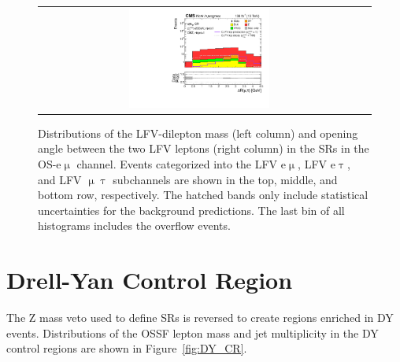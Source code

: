 \begin{figure}[tbh!]
\begin{center}
\begin{tabular}{cc}
 \includegraphics[width=0.45\textwidth]{figures/Part4/Evt/LFVmutaDr}\\
 \end{tabular}
 \caption{Distributions of the LFV-dilepton mass (left column) and opening angle between the two LFV leptons (right column) in the \acp{SR} in the \ac{OS}-e$\upmu$ channel. Events categorized into the LFV e$\upmu$, LFV e$\uptau$, and LFV $\upmu\uptau$ subchannels are shown in the top, middle, and bottom row, respectively. The hatched bands only include statistical uncertainties for the background predictions. The last bin of all histograms includes the overflow events.}
 \label{fig:LFVmass}
 \end{center}
 \end{figure}

\section{Drell-Yan Control Region}
\label{sec:DY_CR}

The Z mass veto used to define \acp{SR} is reversed to create regions enriched in \ac{DY} events. Distributions of the \ac{OSSF} lepton mass and jet multiplicity in the \ac{DY} control regions are shown in Figure~\ref{fig:DY_CR}.

